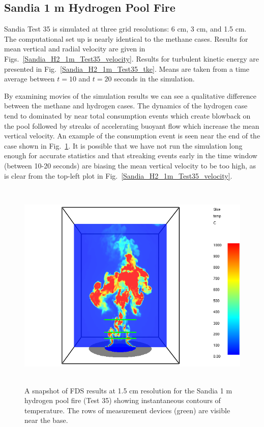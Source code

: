 \clearpage

\subsection{Sandia 1 m Hydrogen Pool Fire}
\label{Sandia_hydrogen}

Sandia Test 35 \cite{Tieszen:2004} is simulated at three grid resolutions: 6 cm, 3 cm, and 1.5 cm.  The computational set up is nearly identical to the methane cases.  Results for mean vertical and radial velocity are given in Figs.~\ref{Sandia_H2_1m_Test35_velocity}.  Results for turbulent kinetic energy are presented in Fig.~\ref{Sandia_H2_1m_Test35_tke}.  Means are taken from a time average between $t=10$ and $t=20$ seconds in the simulation.

By examining movies of the simulation results we can see a qualitative difference between the methane and hydrogen cases.  The dynamics of the hydrogen case tend to dominated by near total consumption events which create blowback on the pool followed by streaks of accelerating buoyant flow which increase the mean vertical velocity.  An example of the consumption event is seen near the end of the case shown in Fig.~\ref{Sandia_H2_1m_image}.  It is possible that we have not run the simulation long enough for accurate statistics and that streaking events early in the time window (between 10-20 seconds) are biasing the mean vertical velocity to be too high, as is clear from the top-left plot in Fig.~\ref{Sandia_H2_1m_Test35_velocity}.

\begin{figure}[h]
\begin{center}
\includegraphics[height=4in]{FIGURES/Sandia_Plumes/Sandia_H2_1m_image}
\caption[Sandia 1~m hydrogen pool fire instantaneous temperature contours.]{A snapshot of FDS results at 1.5 cm resolution for the Sandia 1 m hydrogen pool fire (Test 35) showing instantaneous contours of temperature.  The rows of measurement devices (green) are visible near the base.}
\label{Sandia_H2_1m_image}
\end{center}
\end{figure}

